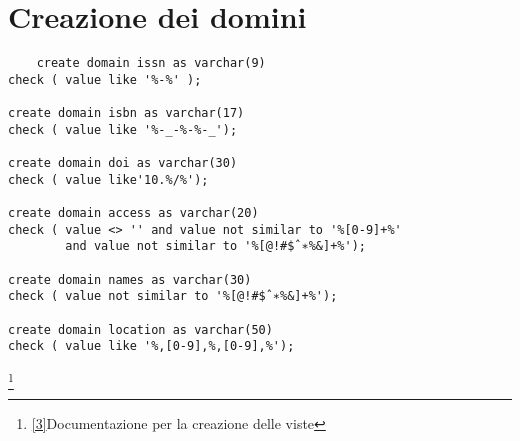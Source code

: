 \section{Creazione dei domini}
\begin{lstlisting}
	create domain issn as varchar(9)
check ( value like '%-%' );

create domain isbn as varchar(17)
check ( value like '%-_-%-%-_');

create domain doi as varchar(30)
check ( value like'10.%/%');

create domain access as varchar(20)
check ( value <> '' and value not similar to '%[0-9]+%'
        and value not similar to '%[@!#$ˆ∗%&]+%');

create domain names as varchar(30)
check ( value not similar to '%[@!#$ˆ∗%&]+%');

create domain location as varchar(50)
check ( value like '%,[0-9],%,[0-9],%');
\end{lstlisting}
\footnote{\href{https://github.com/lorenzotecchia/ProgettoOOBD/blob/main/BD/Documentazione/DocumentazioneCodiceSQL.md#documentazione-del-file-viewssql}{[3]}Documentazione per la creazione delle viste}
